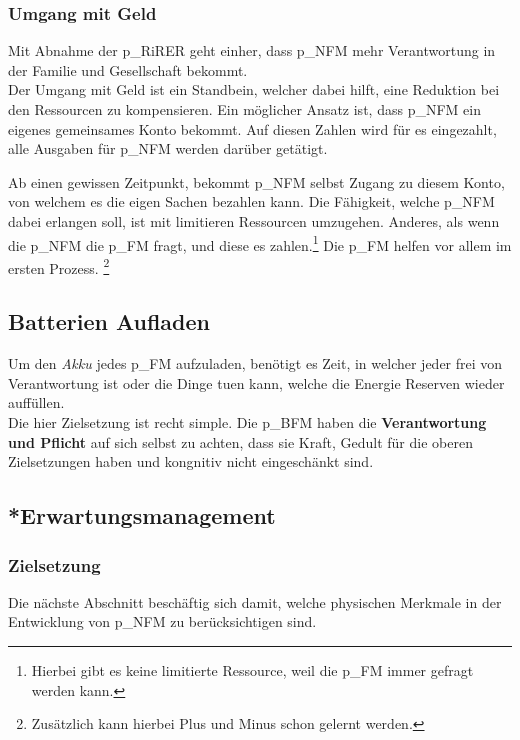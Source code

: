 \subsubsection{Umgang mit Geld}
Mit Abnahme der \gls{p_RiRER} geht einher, dass \gls{p_NFM} mehr Verantwortung in der Familie und Gesellschaft bekommt.\\

Der Umgang mit Geld ist ein Standbein, welcher dabei hilft, eine Reduktion bei den Ressourcen zu kompensieren. Ein möglicher Ansatz ist, dass \gls{p_NFM} ein eigenes gemeinsames Konto bekommt. Auf diesen Zahlen wird für es eingezahlt, alle Ausgaben für \gls{p_NFM} werden darüber getätigt.

Ab einen gewissen Zeitpunkt, bekommt \gls{p_NFM} selbst Zugang zu diesem Konto, von welchem es die eigen Sachen bezahlen kann. Die Fähigkeit, welche \gls{p_NFM} dabei erlangen soll, ist mit limitieren Ressourcen umzugehen. Anderes, als wenn die \gls{p_NFM} die \gls{p_FM} fragt, und diese es zahlen.\footnote{
	Hierbei gibt es keine limitierte Ressource, weil die \gls{p_FM} immer gefragt werden kann.
} Die \gls{p_FM} helfen vor allem im ersten Prozess. \footnote{
	Zusätzlich kann hierbei Plus und Minus schon gelernt werden.
}


\subsection{Batterien Aufladen}

Um den \textit{Akku} jedes \gls{p_FM} aufzuladen, benötigt es Zeit, in welcher jeder frei von Verantwortung ist oder die Dinge tuen kann, welche die Energie Reserven wieder auffüllen.\\

Die hier Zielsetzung ist recht simple. Die \gls{p_BFM} haben die \textbf{Verantwortung und Pflicht} auf sich selbst zu achten, dass sie Kraft, Gedult für die oberen Zielsetzungen haben und kongnitiv nicht eingeschänkt sind.\\

\subsection{*Erwartungsmanagement}
\subsubsection{Zielsetzung}
Die nächste Abschnitt beschäftig sich damit, welche physischen Merkmale in der Entwicklung von \gls{p_NFM} zu berücksichtigen sind.\\ 

